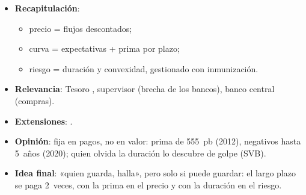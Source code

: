 \documentclass{article}
\begin{document}
\begin{columnas}
\begin{itemize}
\item \textbf{Recapitulación}:
  \begin{itemize}
  \item precio = flujos descontados;
  \item curva = expectativas + prima por plazo;
  \item riesgo = duración y convexidad, gestionado con inmunización.
  \end{itemize}
\item \textbf{Relevancia}: Tesoro , supervisor (brecha de los bancos), banco central (compras).
\item \textbf{Extensiones}:      .
\item \textbf{Opinión}: fija en pagos, no en valor: prima de 555~pb (2012), negativos hasta 5~años (2020); quien olvida la duración lo descubre de golpe (SVB).
\item \textbf{Idea final}: «quien guarda, halla», pero solo si puede guardar: el largo plazo se paga 2~veces, con la prima en el precio y con la duración en el riesgo.
\end{itemize}


\end{columnas}
\end{document}
